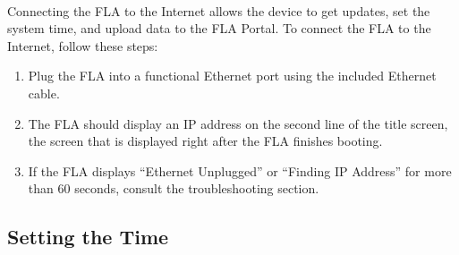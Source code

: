 \documentclass[11pt, oneside]{book}
\begin{document}
\paragraph{  }
Connecting the FLA to the Internet allows the device to get updates,
set the system time, and upload data to the FLA Portal. To connect the FLA to the Internet, follow these steps:
\begin{enumerate}
\item Plug the FLA into a functional Ethernet port using the included Ethernet cable.
\item The FLA should display an IP address on the second line of the title
screen, the screen that is displayed right after the FLA finishes
booting.
\item If the FLA displays ``Ethernet Unplugged'' or ``Finding IP Address''
for more than 60 seconds, consult the troubleshooting section.
\end{enumerate}

\subsection{Setting the Time}
\end{document}
